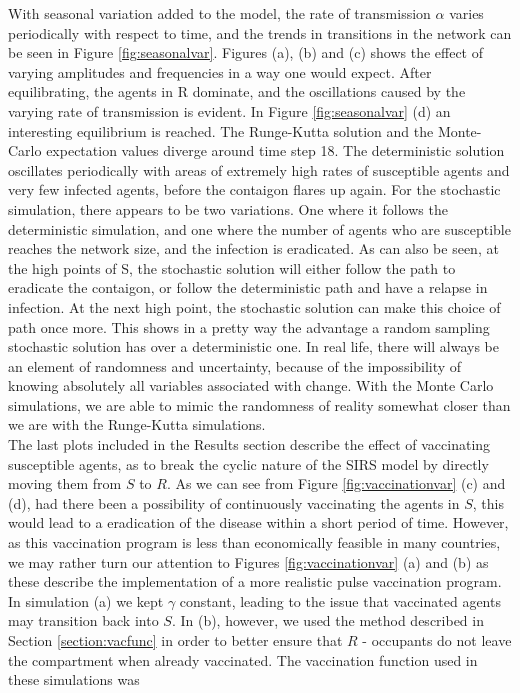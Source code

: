 With seasonal variation added to the model, the rate of transmission $\alpha$ varies periodically with respect to time, and the trends in transitions in the network can be seen in Figure \ref{fig:seasonalvar}. Figures (a), (b) and (c) shows the effect of varying amplitudes and frequencies in a way one would expect. After equilibrating, the agents in R dominate, and the oscillations caused by the varying rate of transmission is evident. In Figure \ref{fig:seasonalvar} (d) an interesting equilibrium is reached. The Runge-Kutta solution and the Monte-Carlo expectation values diverge around time step 18. The deterministic solution oscillates periodically with areas of extremely high rates of susceptible agents and very few infected agents, before the contaigon flares up again. For the stochastic simulation, there appears to be two variations. One where it follows the deterministic simulation, and one where the number of agents who are susceptible reaches the network size, and the infection is eradicated. As can also be seen, at the high points of S, the stochastic solution will either follow the path to eradicate the contaigon, or follow the deterministic path and have a relapse in infection. At the next high point, the stochastic solution can make this choice of path once more. This shows in a pretty way the advantage a random sampling stochastic solution has over a deterministic one. In real life, there will always be an element of randomness and uncertainty, because of the impossibility of knowing absolutely all variables associated with change. With the Monte Carlo simulations, we are able to mimic the randomness of reality somewhat closer than we are with the Runge-Kutta simulations.\\

The last plots included in the Results section describe the effect of vaccinating susceptible agents, as to break the cyclic nature of the SIRS model by directly moving them from $S$ to $R$. As we can see from Figure \ref{fig:vaccinationvar} (c) and (d), had there been a possibility of continuously vaccinating the agents in $S$, this would lead to a eradication of the disease within a short period of time. However, as this vaccination program is less than economically feasible in many countries, we may rather turn our attention to Figures \ref{fig:vaccinationvar} (a) and (b) as these describe the implementation of a more realistic pulse vaccination program. In simulation (a) we kept $\gamma$ constant, leading to the issue that vaccinated agents may transition back into $S$. In (b), however, we used the method described in Section \ref{section:vacfunc} in order to better ensure that $R$ - occupants do not leave the compartment when already vaccinated. The vaccination function used in these simulations was

